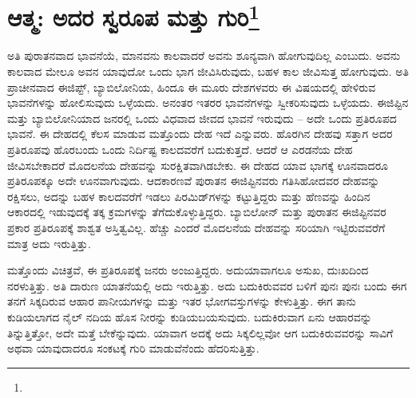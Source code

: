 
\chapter[ಆತ್ಮ: ಅದರ ಸ್ವರೂಪ ಮತ್ತು ಗುರಿ]{ಆತ್ಮ: ಅದರ ಸ್ವರೂಪ ಮತ್ತು ಗುರಿ\protect\footnote{}}

ಅತಿ ಪುರಾತನವಾದ ಭಾವನೆಯೆ, ಮಾನವನು ಕಾಲವಾದರೆ ಅವನು ಶೂನ್ಯವಾಗಿ ಹೋಗುವುದಿಲ್ಲ ಎಂಬುದು. ಅವನು ಕಾಲವಾದ ಮೇಲೂ ಅವನ ಯಾವುದೋ ಒಂದು ಭಾಗ ಜೀವಿಸಿರುವುದು, ಬಹಳ ಕಾಲ ಜೀವಿಸುತ್ತ ಹೋಗುವುದು. ಅತಿ ಪ್ರಾಚೀನವಾದ ಈಜಿಪ್ಟ್, ಬ್ಯಾಬಿಲೋನಿಯ, ಹಿಂದೂ ಈ ಮೂರು ದೇಶಗಳವರು ಈ ವಿಷಯದಲ್ಲಿ ಹೇಳಿರುವ ಭಾವನೆಗಳನ್ನು ಹೋಲಿಸುವುದು ಒಳ್ಳೆಯದು. ಅನಂತರ ಇತರರ ಭಾವನೆಗಳನ್ನು ಸ್ವೀಕರಿಸುವುದು ಒಳ್ಳೆಯದು. ಈಜಿಪ್ಟಿನ ಮತ್ತು ಬ್ಯಾಬಿಲೋನಿಯಾದ ಜನರಲ್ಲಿ ಒಂದು ವಿಧವಾದ ಜೀವದ ಭಾವನೆ ಇರುವುದು – ಅದೇ ಒಂದು ಪ್ರತಿರೂಪದ ಭಾವನೆ. ಈ ದೇಹದಲ್ಲಿ ಕೆಲಸ ಮಾಡುವ ಮತ್ತೊಂದು ದೇಹ ಇದೆ ಎನ್ನುವರು. ಹೊರಗಿನ ದೇಹವು ಸತ್ತಾಗ ಅದರ ಪ್ರತಿರೂಪವು ಹೊರಬಂದು ಒಂದು ನಿರ್ದಿಷ್ಟ ಕಾಲದವರೆಗೆ ಬದುಕುತ್ತದೆ. ಆದರೆ ಆ ಎರಡನೆಯ ದೇಹ ಜೀವಿಸಬೇಕಾದರೆ ಮೊದಲನೆಯ ದೇಹವನ್ನು ಸುರಕ್ಷಿತವಾಗಿಡಬೇಕು. ಈ ದೇಹದ ಯಾವ ಭಾಗಕ್ಕೆ ಊನವಾದರೂ ಪ್ರತಿರೂಪಕ್ಕೂ ಅದೇ ಊನವಾಗುವುದು. ಆದಕಾರಣವೆ ಪುರಾತನ ಈಜಿಪ್ಟಿನವರು ಗತಿಸಿಹೋದವರ ದೇಹವನ್ನು ರಕ್ಷಿಸಲು, ಅದನ್ನು ಬಹಳ ಕಾಲದವರೆಗೆ ಇಡಲು ಪಿರಮಿಡ್‌ಗಳನ್ನು ಕಟ್ಟುತ್ತಿದ್ದರು ಮತ್ತು ಹೆಣವನ್ನು ಹಿಂದಿನ ಆಕಾರದಲ್ಲಿ ಇಡುವುದಕ್ಕೆ ತಕ್ಕ ಕ್ರಮಗಳನ್ನು ತೆಗೆದುಕೊಳ್ಳುತ್ತಿದ್ದರು. ಬ್ಯಾಬಿಲೋನ್ ಮತ್ತು ಪುರಾತನ ಈಜಿಪ್ಟಿನವರ ಪ್ರಕಾರ ಪ್ರತಿರೂಪಕ್ಕೆ ಶಾಶ್ವತ ಅಸ್ತಿತ್ವವಿಲ್ಲ. ಹೆಚ್ಚು ಎಂದರೆ ಮೊದಲನೆಯ ದೇಹವನ್ನು ಸರಿಯಾಗಿ ಇಟ್ಟಿರುವವರೆಗೆ ಮಾತ್ರ ಅದು ಇರುತ್ತಿತ್ತು.

ಮತ್ತೊಂದು ವಿಚಿತ್ರವೆ, ಈ ಪ್ರತಿರೂಪಕ್ಕೆ ಜನರು ಅಂಜುತ್ತಿದ್ದರು. ಅದು\break ಯಾವಾಗಲೂ ಅಸುಖ, ದುಃಖದಿಂದ ನರಳುತ್ತಿತ್ತು. ಅತಿ ದಾರುಣ ಯಾತನೆಯಲ್ಲಿ ಅದು ಇರುತ್ತಿತ್ತು. ಅದು ಬದುಕಿರುವವರ ಬಳಿಗೆ ಪುನಃ ಪುನಃ ಬಂದು ಈಗ ತನಗೆ ಸಿಕ್ಕದಿರುವ ಆಹಾರ ಪಾನೀಯಗಳನ್ನು ಮತ್ತು ಇತರ ಭೋಗವಸ್ತುಗಳನ್ನು ಕೇಳುತ್ತಿತ್ತು. ಈಗ ತಾನು ಕುಡಿಯಲಾಗದ ನೈಲ್ ನದಿಯ ಹೊಸ ನೀರನ್ನು ಕುಡಿಯಬಯಸುವುದು. ಬದುಕಿರುವಾಗ ಏನು ಆಹಾರವನ್ನು ತಿನ್ನುತ್ತಿತ್ತೋ, ಅದೇ ಮತ್ತೆ ಬೇಕೆನ್ನುವುದು. ಯಾವಾಗ ಅದಕ್ಕೆ ಅದು ಸಿಕ್ಕಲಿಲ್ಲವೋ ಆಗ ಬದುಕಿರುವವರನ್ನು ಸಾವಿಗೆ ಅಥವಾ ಯಾವುದಾದರೂ ಸಂಕಟಕ್ಕೆ ಗುರಿ ಮಾಡುವೆನೆಂದು ಹೆದರಿಸುತ್ತಿತ್ತು.

